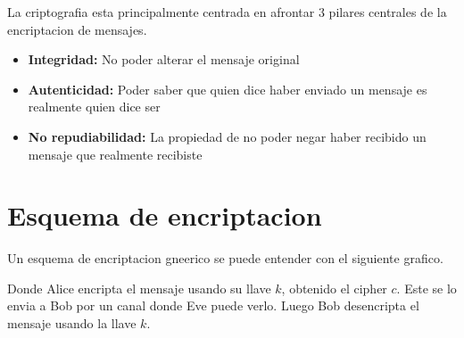 \documentclass[12pt,a4paper]{report}
\begin{document}
La criptografia esta principalmente centrada en afrontar 3 pilares centrales de la encriptacion de mensajes.

\begin{itemize}
  \item{\textbf{Integridad:} No poder alterar el mensaje original}
  \item{\textbf{Autenticidad:} Poder saber que quien dice haber enviado un mensaje es realmente quien dice ser}
  \item{\textbf{No repudiabilidad:} La propiedad de no poder negar haber recibido un mensaje que realmente recibiste}
\end{itemize}

\section{Esquema de encriptacion}

Un esquema de encriptacion gneerico se puede entender con el siguiente grafico.

\begin{center}
\end{center}

Donde Alice encripta el mensaje usando su llave $k$, obtenido el cipher $c$. Este se lo envia a Bob por un canal donde Eve puede verlo. Luego Bob desencripta el mensaje usando la llave $k$.
\end{document}
